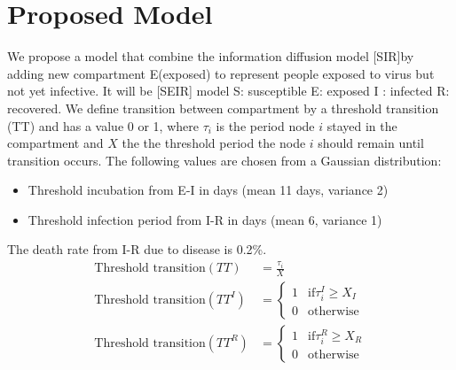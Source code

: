 \documentclass[conference]{IEEEtran}
\begin{document}
\section{Proposed Model} %
We propose a model that combine the information diffusion model [SIR]by adding new compartment E(exposed) to represent people exposed to virus but not yet infective. It will  be [SEIR] model S: susceptible  E: exposed  I : infected  R: recovered. We define transition between compartment by a threshold transition (TT) and has a value 0 or 1, where $\tau_i$ is the period node $i$ stayed in the compartment and $X$ the the threshold period the node $i$ should remain until transition occurs. The following values are chosen from a Gaussian distribution:
\begin{itemize}
    \item Threshold incubation from E-I in days (mean 11 days, variance 2) 
    \item Threshold infection period from I-R in days (mean 6, variance 1)
\end{itemize}
The death rate from I-R due to disease is 0.2\%.
\begin{align*}
    \text{Threshold transition}(TT) &= \frac{\tau_{i}}{X}\\
    \text{Threshold transition}(TT^{I}) &=%
    \begin{cases}
    1 &\text{if} \tau_{i}^{I} \geq X_{I}\\
    0 &\text{otherwise}
    \end{cases}\\
    \text{Threshold transition}(TT^{R}) &=%
    \begin{cases}
    1 &\text{if} \tau_{i}^{R} \geq X_{R}\\
    0 &\text{otherwise}
    \end{cases}
\end{align*}
\end{document}
